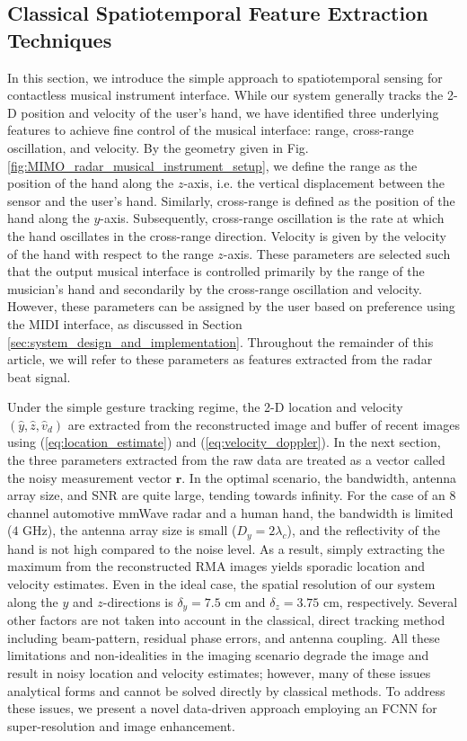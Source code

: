 \documentclass[10pt,journal,final]{IEEEtran}
\begin{document}
\subsection{Classical Spatiotemporal Feature Extraction Techniques}
\label{subsec:classical_gesture_tracking}
In this section, we introduce the simple approach to spatiotemporal sensing for contactless musical instrument interface.
While our system generally tracks the 2-D position and velocity of the user's hand, we have identified three underlying features to achieve fine control of the musical interface: range, cross-range oscillation, and velocity. 
By the geometry given in Fig. \ref{fig:MIMO_radar_musical_instrument_setup}, we define the range as the position of the hand along the $z$-axis, i.e. the vertical displacement between the sensor and the user's hand. 
Similarly, cross-range is defined as the position of the hand along the $y$-axis.
Subsequently, cross-range oscillation is the rate at which the hand oscillates in the cross-range direction.
Velocity is given by the velocity of the hand with respect to the range $z$-axis. 
These parameters are selected such that the output musical interface is controlled primarily by the range of the musician's hand and secondarily by the cross-range oscillation and velocity.
However, these parameters can be assigned by the user based on preference using the MIDI interface, as discussed in Section \ref{sec:system_design_and_implementation}.
Throughout the remainder of this article, we will refer to these parameters as features extracted from the radar beat signal.

Under the simple gesture tracking regime, the 2-D location and velocity $(\hat{y},\hat{z},\hat{v}_d)$ are extracted from the reconstructed image and buffer of recent images using (\ref{eq:location_estimate}) and (\ref{eq:velocity_doppler}). 
In the next section, the three parameters extracted from the raw data are treated as a vector called the noisy measurement vector $\mathbf{r}$. 
In the optimal scenario, the bandwidth, antenna array size, and SNR are quite large, tending towards infinity.
For the case of an $8$ channel automotive mmWave radar and a human hand, the bandwidth is limited ($4$ GHz), the antenna array size is small ($D_y = 2\lambda_c$), and the reflectivity of the hand is not high compared to the noise level. 
As a result, simply extracting the maximum from the reconstructed RMA images yields sporadic location and velocity estimates. 
Even in the ideal case, the spatial resolution of our system along the $y$ and $z$-directions is $\delta_y = 7.5$ cm and $\delta_z = 3.75$ cm, respectively.
Several other factors are not taken into account in the classical, direct tracking method including beam-pattern, residual phase errors, and antenna coupling. 
All these limitations and non-idealities in the imaging scenario degrade the image and result in noisy location and velocity estimates; however, many of these issues analytical forms and cannot be solved directly by classical methods. 
To address these issues, we present a novel data-driven approach employing an FCNN for super-resolution and image enhancement. 
\end{document}
